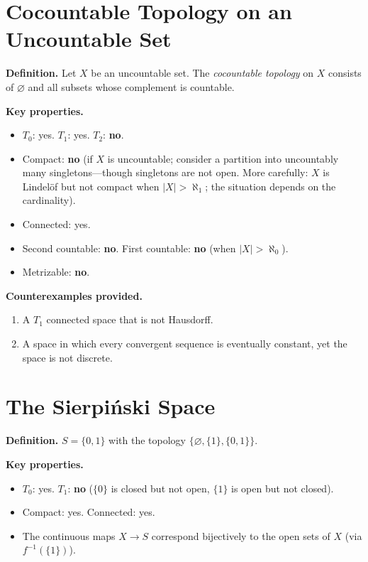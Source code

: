 \documentclass[11pt,a4paper,twoside]{book}
\theoremstyle{remark}
\theoremstyle{definition}
\theoremstyle{definition}
\begin{document}
\section{Cocountable Topology on an Uncountable Set}
\label{app:cocountable}

\textbf{Definition.}
Let $X$ be an uncountable set.  The \emph{cocountable topology} on $X$
consists of $\varnothing$ and all subsets whose complement is countable.

\medskip
\textbf{Key properties.}
\begin{itemize}
  \item $T_0$: yes. \quad $T_1$: yes. \quad $T_2$: \textbf{no}.
  \item Compact: \textbf{no} (if $X$ is uncountable; consider a
        partition into uncountably many singletons---though singletons
        are not open.  More carefully: $X$ is Lindel\"of but not compact
        when $|X|>\aleph_1$; the situation depends on the cardinality).
  \item Connected: yes.
  \item Second countable: \textbf{no}. \quad First countable: \textbf{no}
        (when $|X|>\aleph_0$).
  \item Metrizable: \textbf{no}.
\end{itemize}

\textbf{Counterexamples provided.}
\begin{enumerate}
  \item A $T_1$ connected space that is not Hausdorff.
  \item A space in which every convergent sequence is eventually
        constant, yet the space is not discrete.
\end{enumerate}

\section{The Sierpi\'{n}ski Space}
\label{app:sierpinski}

\textbf{Definition.}
$S=\{0,1\}$ with the topology $\{\varnothing,\{1\},\{0,1\}\}$.

\medskip
\textbf{Key properties.}
\begin{itemize}
  \item $T_0$: yes. \quad $T_1$: \textbf{no} ($\{0\}$ is closed but not
        open, $\{1\}$ is open but not closed).
  \item Compact: yes. \quad Connected: yes.
  \item The continuous maps $X\to S$ correspond bijectively to the open
        sets of $X$ (via $f^{-1}(\{1\})$).
\end{itemize}
\end{document}
